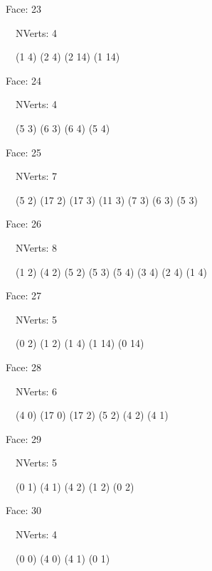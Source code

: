 \documentclass{article}
\begin{document}
{\footnotesize 

Face: 23

\   \    NVerts: 4

 \   \   (1 4) (2 4) (2 14) (1 14)}

{\footnotesize 

Face: 24

\   \    NVerts: 4

 \   \   (5 3) (6 3) (6 4) (5 4)}

{\footnotesize 

Face: 25

\   \    NVerts: 7

 \   \   (5 2) (17 2) (17 3) (11 3) (7 3) (6 3) (5 3)}

{\footnotesize 

Face: 26

\   \    NVerts: 8

 \   \   (1 2) (4 2) (5 2) (5 3) (5 4) (3 4) (2 4) (1 4)}

{\footnotesize 

Face: 27

\   \    NVerts: 5

 \   \   (0 2) (1 2) (1 4) (1 14) (0 14)}

{\footnotesize 

Face: 28

\   \    NVerts: 6

 \   \   (4 0) (17 0) (17 2) (5 2) (4 2) (4 1)}

{\footnotesize 

Face: 29

\   \    NVerts: 5

 \   \   (0 1) (4 1) (4 2) (1 2) (0 2)}

{\footnotesize 

Face: 30

\   \    NVerts: 4

 \   \   (0 0) (4 0) (4 1) (0 1)}


 \newpage
\end{document}
